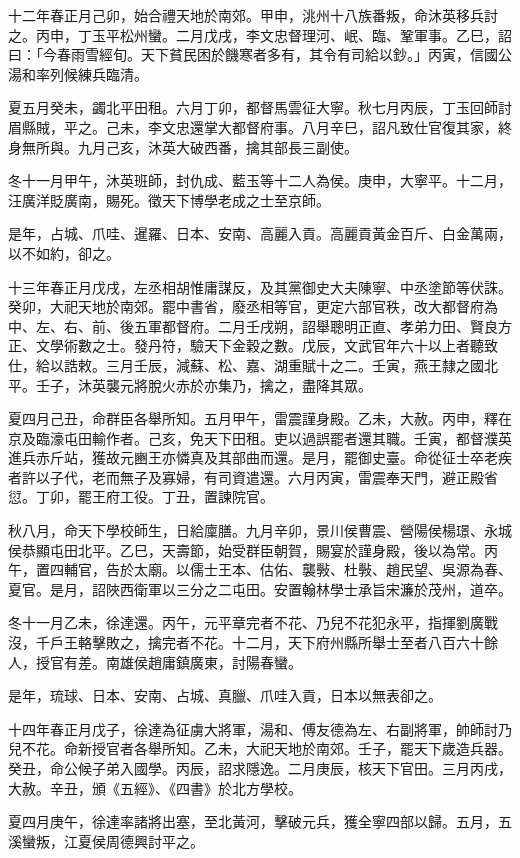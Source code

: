\begin{pinyinscope}
十二年春正月己卯，始合禮天地於南郊。甲申，洮州十八族番叛，命沐英移兵討之。丙申，丁玉平松州蠻。二月戊戌，李文忠督理河、岷、臨、鞏軍事。乙巳，詔曰：「今春雨雪經旬。天下貧民困於饑寒者多有，其令有司給以鈔。」丙寅，信國公湯和率列候練兵臨清。

夏五月癸未，蠲北平田租。六月丁卯，都督馬雲征大寧。秋七月丙辰，丁玉回師討眉縣賊，平之。己未，李文忠還掌大都督府事。八月辛巳，詔凡致仕官復其家，終身無所與。九月己亥，沐英大破西番，擒其部長三副使。

冬十一月甲午，沐英班師，封仇成、藍玉等十二人為侯。庚申，大寧平。十二月，汪廣洋貶廣南，賜死。徵天下博學老成之士至京師。

是年，占城、爪哇、暹羅、日本、安南、高麗入貢。高麗貢黃金百斤、白金萬兩，以不如約，卻之。

十三年春正月戊戌，左丞相胡惟庸謀反，及其黨御史大夫陳寧、中丞塗節等伏誅。癸卯，大祀天地於南郊。罷中書省，廢丞相等官，更定六部官秩，改大都督府為中、左、右、前、後五軍都督府。二月壬戌朔，詔舉聰明正直、孝弟力田、賢良方正、文學術數之士。發丹符，驗天下金穀之數。戊辰，文武官年六十以上者聽致仕，給以誥敕。三月壬辰，減蘇、松、嘉、湖重賦十之二。壬寅，燕王隸之國北平。壬子，沐英襲元將脫火赤於亦集乃，擒之，盡降其眾。

夏四月己丑，命群臣各舉所知。五月甲午，雷震謹身殿。乙未，大赦。丙申，釋在京及臨濠屯田輸作者。己亥，免天下田租。吏以過誤罷者還其職。壬寅，都督濮英進兵赤斤站，獲故元豳王亦憐真及其部曲而還。是月，罷御史臺。命從征士卒老疾者許以子代，老而無子及寡婦，有司資遣還。六月丙寅，雷震奉天門，避正殿省愆。丁卯，罷王府工役。丁丑，置諫院官。

秋八月，命天下學校師生，日給廩膳。九月辛卯，景川侯曹震、營陽侯楊璟、永城侯恭顯屯田北平。乙巳，天壽節，始受群臣朝賀，賜宴於謹身殿，後以為常。丙午，置四輔官，告於太廟。以儒士王本、估佑、襲斅、杜斅、趙民望、吳源為春、夏官。是月，詔陜西衛軍以三分之二屯田。安置翰林學士承旨宋濂於茂州，道卒。

冬十一月乙未，徐達還。丙午，元平章完者不花、乃兒不花犯永平，指揮劉廣戰沒，千戶王輅擊敗之，擒完者不花。十二月，天下府州縣所舉士至者八百六十餘人，授官有差。南雄侯趙庸鎮廣東，討陽春蠻。

是年，琉球、日本、安南、占城、真臘、爪哇入貢，日本以無表卻之。

十四年春正月戊子，徐達為征虜大將軍，湯和、傅友德為左、右副將軍，帥師討乃兒不花。命新授官者各舉所知。乙未，大祀天地於南郊。壬子，罷天下歲造兵器。癸丑，命公候子弟入國學。丙辰，詔求隱逸。二月庚辰，核天下官田。三月丙戌，大赦。辛丑，頒《五經》、《四書》於北方學校。

夏四月庚午，徐達率諸將出塞，至北黃河，擊破元兵，獲全寧四部以歸。五月，五溪蠻叛，江夏侯周德興討平之。


\end{pinyinscope}
